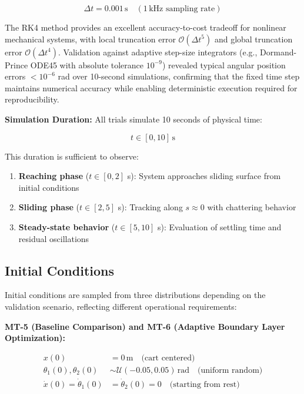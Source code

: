 \begin{equation}
\label{eq:time_step}
\Delta t = 0.001 \, \text{s} \quad (1 \, \text{kHz sampling rate})
\end{equation}

The RK4 method provides an excellent accuracy-to-cost tradeoff for nonlinear mechanical systems, with local truncation error $\mathcal{O}(\Delta t^5)$ and global truncation error $\mathcal{O}(\Delta t^4)$. Validation against adaptive step-size integrators (e.g., Dormand-Prince ODE45 with absolute tolerance $10^{-9}$) revealed typical angular position errors $< 10^{-6}$ rad over 10-second simulations, confirming that the fixed time step maintains numerical accuracy while enabling deterministic execution required for reproducibility.

\textbf{Simulation Duration:}
All trials simulate 10 seconds of physical time:

\begin{equation}
\label{eq:sim_duration}
t \in [0, 10] \, \text{s}
\end{equation}

This duration is sufficient to observe:
\begin{enumerate}
    \item \textbf{Reaching phase} ($t \in [0, 2]$ s): System approaches sliding surface from initial conditions
    \item \textbf{Sliding phase} ($t \in [2, 5]$ s): Tracking along $s \approx 0$ with chattering behavior
    \item \textbf{Steady-state behavior} ($t \in [5, 10]$ s): Evaluation of settling time and residual oscillations
\end{enumerate}

\subsection{Initial Conditions}
\label{subsec:initial_conditions}

Initial conditions are sampled from three distributions depending on the validation scenario, reflecting different operational requirements:

\textbf{MT-5 (Baseline Comparison) and MT-6 (Adaptive Boundary Layer Optimization):}

\begin{align}
\label{eq:initial_conditions_nominal}
x(0) &= 0 \, \text{m} \quad \text{(cart centered)} \nonumber \\
\theta_1(0), \theta_2(0) &\sim \mathcal{U}(-0.05, 0.05) \, \text{rad} \quad \text{(uniform random)} \\
\dot{x}(0) = \dot{\theta}_1(0) &= \dot{\theta}_2(0) = 0 \quad \text{(starting from rest)} \nonumber
\end{align}

